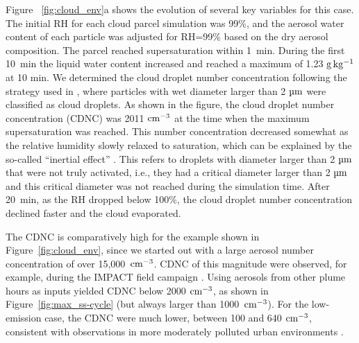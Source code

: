 \documentclass[edeposit,fullpage]{uiucthesis2009}
\begin{document}
Figure ~\ref{fig:cloud_env}a shows the evolution of several key
variables for this case. The initial RH for each cloud parcel
  simulation was 99\%, and the aerosol water content of each particle
  was adjusted for RH=99\% based on the dry aerosol composition. The
  parcel reached supersaturation within 1~min. During the
first 10~min the liquid water content increased and reached a maximum
of 1.23 $\rm g \, kg^{-1}$ at 10 min. We determined the cloud droplet
number concentration following the strategy used in \citet{ching2012impacts},
where particles with wet diameter larger than 2 $\rm \mu m$ were
classified as cloud droplets. As shown in the figure, the cloud
droplet number concentration (CDNC) was 2011 $\rm cm^{-3}$ at the time
when the maximum supersaturation was reached. This number
concentration decreased somewhat as the relative humidity slowly
relaxed to saturation, which can be explained by the so-called
``inertial effect'' \citep{Chuang1997, Nenes2001}. This refers to
droplets with diameter larger than 2 $\rm \mu m$ that were not truly
activated, i.e., they had a critical diameter larger than 2 $\rm \mu
m$ and this critical diameter was not reached during the simulation
time.  After 20~min, as the RH dropped below 100\%, the cloud droplet
number concentration declined faster and the cloud evaporated.

The CDNC is comparatively high for the example shown in
Figure~\ref{fig:cloud_env}, since we started out with a large aerosol
number concentration of over 15,000~$\rm cm^{-3}$. CDNC of this
magnitude were observed, for example, during the IMPACT field campaign
\citep{brenguier2011cloud}.  Using aerosols from other plume hours as
inputs yielded CDNC below 2000 $\rm cm^{-3}$, as shown in
Figure~\ref{fig:max_ss-cycle} (but always larger than 1000~$\rm
cm^{-3}$). For the low-emission case, the CDNC were much lower,
between 100 and 640 $\rm cm^{-3}$, consistent with observations in
more moderately polluted urban environments \citep{ahmad2013long}.
\end{document}

